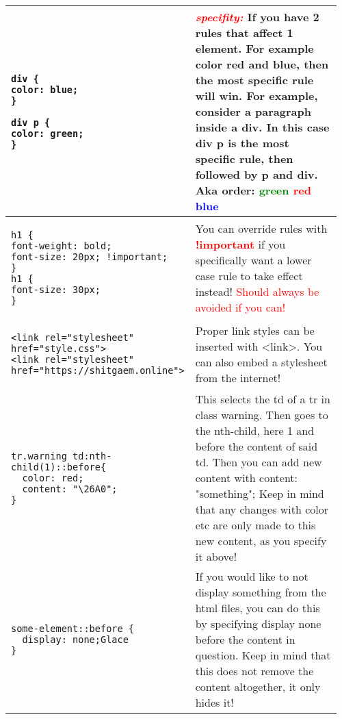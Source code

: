\documentclass[main.tex,fontsize=8pt,paper=a4,paper=portrait,DIV=calc,]{scrartcl}
\begin{document}
\begin{table}[h!]
\begin{tabular}{|m{0.35\linewidth}|m{0.605\linewidth}|}
\begin{lstlisting}
div {
color: blue;
}

div p {
color: green;
}
\end{lstlisting} &
\textcolor{red}{\textbf{\emph{specifity:}}} \newline
If you have 2 rules that affect 1 element. For example color red and blue, then the most specific rule will win.\newline
For example, consider a paragraph inside a div.\newline
In this case div p is the most specific rule, then followed by p and div.\newline
Aka order: \textcolor{green}{green} \textcolor{red}{red} \textcolor{blue}{blue}\\
\hline
\begin{lstlisting}
h1 {
font-weight: bold;
font-size: 20px; !important;
}
h1 {
font-size: 30px;
}
\end{lstlisting}
& You can override rules with \textbf{\textcolor{red}{!important}} if you specifically want a lower case rule to take effect instead!\newline
\textcolor{red}{Should always be avoided if you can!}\\
\hline
\begin{lstlisting}
<link rel="stylesheet" href="style.css">
<link rel="stylesheet" href="https://shitgaem.online">
\end{lstlisting} & 
Proper link styles can be inserted with <link>. You can also embed a stylesheet from the internet!\\
\hline
\begin{lstlisting}
tr.warning td:nth-child(1)::before{
  color: red;
  content: "\26A0";
}
\end{lstlisting}
& This selects the td of a tr in class warning. Then goes to the nth-child, here 1 and before the content of said td.\newline
Then you can add new content with content: "something";\newline
Keep in mind that any changes with color etc are only made to this new content,\newline 
as you specify it above!
\\
\hline
\begin{lstlisting}
some-element::before {
  display: none;Glace
}
\end{lstlisting}
& If you would like to not display something from the html files, you can do this by specifying
display none before the content in question. \newline Keep in mind that this does not remove the content altogether, it only hides it!

\end{tabular}
\end{table}
\end{document}
